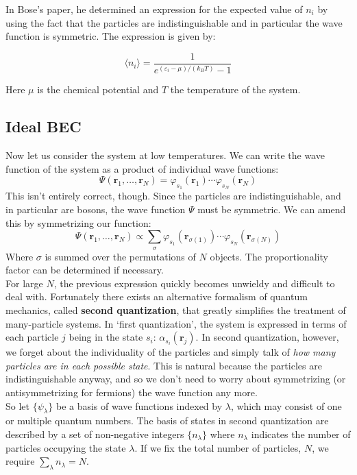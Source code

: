 \documentclass{article}
\begin{document}
In Bose's paper, he determined an expression for the expected value of $n_i$ by using the fact that the particles are indistinguishable and in particular the wave function is symmetric.  The expression is given by:

\[\langle n_i \rangle = \frac{1}{e^{(\varepsilon_i-\mu)/(k_B T)} - 1}\]

Here $\mu$ is the chemical potential and $T$ the temperature of the system.

\subsection{Ideal BEC}

Now let us consider the system at low temperatures.
We can write the wave function of the system as a product of
individual wave functions:
\[\Psi(\mathbf{r}_1, \dots, \mathbf{r}_N) =
    \varphi_{s_1}(\mathbf{r}_1)\dotsb\varphi_{s_N}(\mathbf{r}_N)\]
This isn't entirely correct, though.  Since the particles are indistinguishable, and in particular are bosons, the wave function $\Psi$ must be symmetric.  We can amend this by symmetrizing our function:
\[\Psi(\mathbf{r}_1, \dots, \mathbf{r}_N) \propto \sum_{\sigma}
        \varphi_{s_1}(\mathbf{r}_{\sigma(1)})\dotsb
        \varphi_{s_N}(\mathbf{r}_{\sigma(N)})\]
Where $\sigma$ is summed over the permutations of $N$ objects.  The proportionality factor can be determined if necessary.
\\

For large $N$, the previous expression quickly becomes unwieldy and difficult to deal with.  Fortunately there exists an alternative formalism of quantum mechanics, called \textbf{second quantization}, that greatly simplifies the treatment of many-particle systems.  In `first quantization', the system is expressed in terms of each particle $j$ being in the state $s_i$: $\alpha_{s_i}(\mathbf{r}_j)$.  In second quantization, however, we forget about the individuality of the particles and simply talk of \textit{how many particles are in each possible state}.  This is natural because the particles are indistinguishable anyway, and so we don't need to worry about symmetrizing (or antisymmetrizing for fermions) the wave function any more.
\\

So let $\{\psi_\lambda\}$ be a basis of wave functions indexed by $\lambda$, which may consist of one or multiple quantum numbers.  The basis of states in second quantization are described by a set of non-negative integers $\{n_\lambda\}$ where $n_\lambda$ indicates the number of particles occupying the state $\lambda$.  If we fix the total number of particles, $N$, we require $\sum_\lambda{n_\lambda} = N$.
\\
\end{document}
